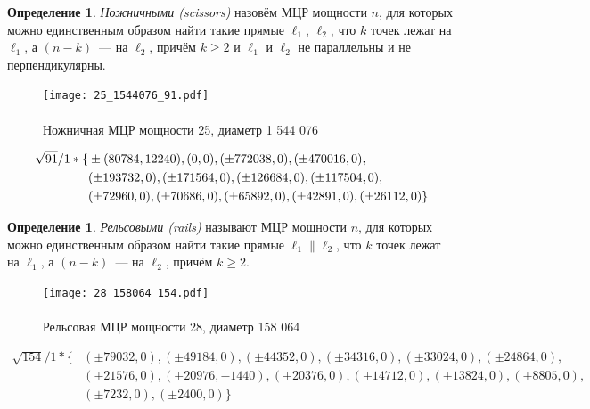 \documentclass[10pt,pdf,hyperref={unicode},aspectratio=169]{beamer}
\theoremstyle{definition}
\newtheorem{ddefinition}[llemma]{Определение}
\begin{document}
\begin{frame}

	\begin{ddefinition}
		\emph{ Ножничными (scissors)} назовём МЦР мощности $n$,
		для которых можно единственным образом найти такие прямые $\ell_1$, $\ell_2$,
		что $k$ точек лежат на $\ell_1$, а $(n - k)$~--- на $\ell_2$, причём $k \geqslant 2$ и
		$\ell_1$ и $\ell_2$ не параллельны и не перпендикулярны.
	\end{ddefinition}


    \begin{figure}[h!]
    	\centering
    	\texttt{[image: 25\_1544076\_91.pdf]}
    	\\~\\{Ножничная МЦР мощности 25, диаметр 1 544 076}
    \end{figure}

    \begin{align*}\footnotesize
        \sqrt{91}/1 * \{ &
		\pm(80784, 12240),
        (0, 0),
        (\pm 772038, 0),
        (\pm 470016, 0),
        \\&
        (\pm 193732, 0),
        (\pm 171564, 0),
        (\pm 126684, 0),
        (\pm 117504, 0),
        \\&
        (\pm 72960, 0),
        (\pm 70686, 0),
        (\pm 65892, 0),
        (\pm 42891, 0),
        (\pm 26112, 0)
        \}
    \end{align*}
\end{frame}

\begin{frame}


    \begin{ddefinition}
		\emph{ Рельсовыми (rails)} называют МЦР
		мощности $n$, для которых можно единственным образом найти такие прямые $\ell_1 \| \ell_2$,
		что $k$ точек лежат на $\ell_1$,
		а $(n - k)$~--- на  $\ell_2$, причём $k \geqslant 2$.
	\end{ddefinition}

	\begin{figure}
		\centering
		\texttt{[image: 28\_158064\_154.pdf]}
		\\~\\{Рельсовая МЦР мощности 28, диаметр 158 064}
	\end{figure}

    \begin{align*}
    	\sqrt{154}/1 * \{
		&
    	(\pm 79032, 0),
    	(\pm 49184, 0),
    	(\pm 44352, 0),
    	(\pm 34316, 0),
    	(\pm 33024, 0),
    	(\pm 24864, 0), \\
    	&(\pm 21576, 0),
    	(\pm 20976, -1440),
    	(\pm 20376, 0),
    	(\pm 14712, 0),
    	(\pm 13824, 0),
    	(\pm 8805, 0), \\
    	&(\pm 7232, 0),
    	(\pm 2400, 0)
    	\}
    \end{align*}


\end{frame}
\end{document}
